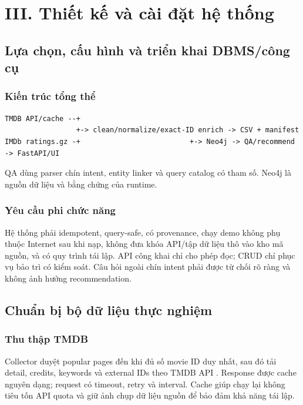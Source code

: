 \chapter{III. Thiết kế và cài đặt hệ thống}

\section{Lựa chọn, cấu hình và triển khai DBMS/công cụ}

\subsection{Kiến trúc tổng thể}

\begin{Verbatim}[fontsize=\scriptsize,frame=single]
TMDB API/cache --+
                 +-> clean/normalize/exact-ID enrich -> CSV + manifest
IMDb ratings.gz -+                          +-> Neo4j -> QA/recommend -> FastAPI/UI
\end{Verbatim}

QA dùng parser chín intent, entity linker và query catalog có tham số. Neo4j là
nguồn dữ liệu và bằng chứng của runtime.

\subsection{Yêu cầu phi chức năng}

Hệ thống phải idempotent, query-safe, có provenance, chạy demo không phụ thuộc
Internet sau khi nạp, không đưa khóa API/tập dữ liệu thô vào kho mã nguồn, và có
quy trình tái lập.
API công khai chỉ cho phép đọc; CRUD chỉ phục vụ bảo trì có kiểm soát. Câu hỏi ngoài
chín intent phải được từ chối rõ ràng và không ảnh hưởng recommendation.

\section{Chuẩn bị bộ dữ liệu thực nghiệm}

\subsection{Thu thập TMDB}

Collector duyệt popular pages đến khi đủ số movie ID duy nhất, sau đó tải detail,
credits, keywords và external IDs theo TMDB API \cite{tmdb2026api}. Response được cache nguyên dạng; request có
timeout, retry và interval. Cache giúp chạy lại không tiêu tốn API quota và giữ
ảnh chụp dữ liệu nguồn để bảo đảm khả năng tái lập.

